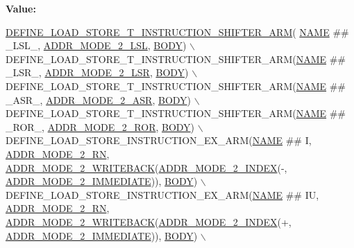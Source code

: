 {\bfseries Value\+:}
\begin{DoxyCode}
\mbox{\hyperlink{isa-arm_8c_a735d8637e51804e2c8b174f9edc43e04}{DEFINE\_LOAD\_STORE\_T\_INSTRUCTION\_SHIFTER\_ARM}}(
      \mbox{\hyperlink{inflate_8h_a164ea0159d5f0b5f12a646f25f99eceaa67bc2ced260a8e43805d2480a785d312}{NAME}} ## \_LSL\_, \mbox{\hyperlink{isa-arm_8c_a3eaad6b803c92180598a98e9d706453a}{ADDR\_MODE\_2\_LSL}}, \mbox{\hyperlink{gzlog_8c_aa6bdf6a6d9916c343e1e17774d84a156}{BODY}}) \(\backslash\)
    DEFINE\_LOAD\_STORE\_T\_INSTRUCTION\_SHIFTER\_ARM(\mbox{\hyperlink{inflate_8h_a164ea0159d5f0b5f12a646f25f99eceaa67bc2ced260a8e43805d2480a785d312}{NAME}} ## \_LSR\_, 
      \mbox{\hyperlink{isa-arm_8c_a8d15dc58f1451c9397fe0e2017976826}{ADDR\_MODE\_2\_LSR}}, \mbox{\hyperlink{gzlog_8c_aa6bdf6a6d9916c343e1e17774d84a156}{BODY}}) \(\backslash\)
    DEFINE\_LOAD\_STORE\_T\_INSTRUCTION\_SHIFTER\_ARM(\mbox{\hyperlink{inflate_8h_a164ea0159d5f0b5f12a646f25f99eceaa67bc2ced260a8e43805d2480a785d312}{NAME}} ## \_ASR\_, 
      \mbox{\hyperlink{isa-arm_8c_ada13cb8a55fb5c07e68d39c1e71145e6}{ADDR\_MODE\_2\_ASR}}, \mbox{\hyperlink{gzlog_8c_aa6bdf6a6d9916c343e1e17774d84a156}{BODY}}) \(\backslash\)
    DEFINE\_LOAD\_STORE\_T\_INSTRUCTION\_SHIFTER\_ARM(\mbox{\hyperlink{inflate_8h_a164ea0159d5f0b5f12a646f25f99eceaa67bc2ced260a8e43805d2480a785d312}{NAME}} ## \_ROR\_, 
      \mbox{\hyperlink{isa-arm_8c_aaca37bb8bd19deeb47a5427bef082525}{ADDR\_MODE\_2\_ROR}}, \mbox{\hyperlink{gzlog_8c_aa6bdf6a6d9916c343e1e17774d84a156}{BODY}}) \(\backslash\)
    DEFINE\_LOAD\_STORE\_INSTRUCTION\_EX\_ARM(\mbox{\hyperlink{inflate_8h_a164ea0159d5f0b5f12a646f25f99eceaa67bc2ced260a8e43805d2480a785d312}{NAME}} ## I, \mbox{\hyperlink{isa-arm_8c_aa70b435f484716b425cd7376e52d9320}{ADDR\_MODE\_2\_RN}}, 
      \mbox{\hyperlink{isa-arm_8c_a6cbeb951edc491533b2b648bb318961b}{ADDR\_MODE\_2\_WRITEBACK}}(\mbox{\hyperlink{isa-arm_8c_a2521ae1da803e2179985f57ede8ad83f}{ADDR\_MODE\_2\_INDEX}}(-, 
      \mbox{\hyperlink{isa-arm_8c_a0d73c54154259ea56e296afbbd43246a}{ADDR\_MODE\_2\_IMMEDIATE}})), \mbox{\hyperlink{gzlog_8c_aa6bdf6a6d9916c343e1e17774d84a156}{BODY}}) \(\backslash\)
    DEFINE\_LOAD\_STORE\_INSTRUCTION\_EX\_ARM(\mbox{\hyperlink{inflate_8h_a164ea0159d5f0b5f12a646f25f99eceaa67bc2ced260a8e43805d2480a785d312}{NAME}} ## IU, \mbox{\hyperlink{isa-arm_8c_aa70b435f484716b425cd7376e52d9320}{ADDR\_MODE\_2\_RN}}, 
      \mbox{\hyperlink{isa-arm_8c_a6cbeb951edc491533b2b648bb318961b}{ADDR\_MODE\_2\_WRITEBACK}}(\mbox{\hyperlink{isa-arm_8c_a2521ae1da803e2179985f57ede8ad83f}{ADDR\_MODE\_2\_INDEX}}(+, 
      \mbox{\hyperlink{isa-arm_8c_a0d73c54154259ea56e296afbbd43246a}{ADDR\_MODE\_2\_IMMEDIATE}})), \mbox{\hyperlink{gzlog_8c_aa6bdf6a6d9916c343e1e17774d84a156}{BODY}}) \(\backslash\)
\end{DoxyCode}
